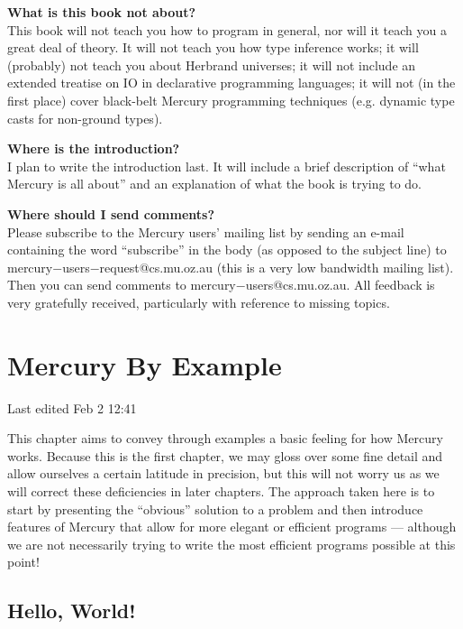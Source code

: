\documentclass[a4paper,11pt,notitlepage,onecolumn]{book}
\begin{document}
\textbf{What is this book not about?}
\\
This book will not teach you how to program in general, nor will it teach
you a great deal of theory.  It will not teach you how type inference works;
it will (probably) not teach you about Herbrand universes; it will not
include an extended treatise on IO in declarative programming languages; it
will not (in the first place) cover black-belt Mercury programming
techniques (e.g. dynamic type casts for non-ground types).

\textbf{Where is the introduction?}
\\
I plan to write the introduction last.  It will include a brief description
of ``what Mercury is all about'' and an explanation of what the book is
trying to do.

\textbf{Where should I send comments?}
\\
Please subscribe to the Mercury users' mailing list by sending an e-mail
containing the word ``subscribe'' in the body (as opposed to the subject
line) to \textsf{mercury{\ensuremath{-}}users{\ensuremath{-}}request@cs.mu.oz.au} (this is a very low bandwidth
mailing list).  Then you can send comments to \textsf{mercury{\ensuremath{-}}users@cs.mu.oz.au}.
All feedback is very gratefully received, particularly with reference to
missing topics.
\setcounter{chapter}{0}

\chapter{Mercury By Example}

Last edited Feb 2 12:41

This chapter aims to convey through examples a basic feeling for how
Mercury works.  Because this is the first chapter, we may gloss over some
fine detail and allow ourselves a certain latitude in precision, but this
will not worry us as we will correct these deficiencies in later chapters.
The approach taken here is to start by presenting the ``obvious'' solution
to a problem and then introduce features of Mercury that allow for more
elegant or efficient programs --- although we are not necessarily trying to
write the most efficient programs possible at this point! 



\section{Hello, World!}
\end{document}
